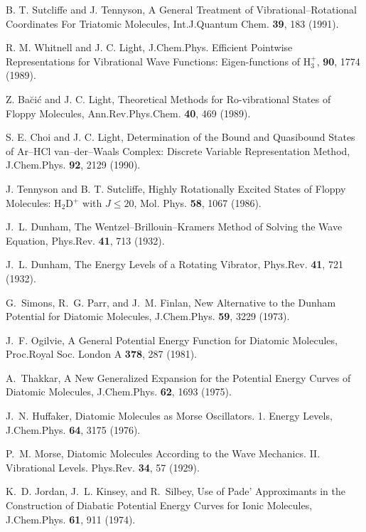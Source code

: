 \begin{thebibliography}{999}
B. T. Sutcliffe and J. Tennyson, 
A General Treatment of Vibrational--Rotational Coordinates
For Triatomic Molecules,
Int.J.Quantum Chem. {\bf 39},
183 (1991).

R. M. Whitnell and J. C. Light, J.Chem.Phys. 
Efficient Pointwise Representations for
Vibrational Wave Functions: Eigen-functions of H$_3^+$,
{\bf 90}, 1774 (1989).

Z. Ba\u{c}i\'{c} and J. C. Light, 
Theoretical Methods for Ro-vibrational States of Floppy 
Molecules,
Ann.Rev.Phys.Chem. {\bf 40}, 
469 (1989).

S. E. Choi and J. C. Light, 
Determination of the Bound and Quasibound States of Ar--HCl
van--der--Waals Complex:
Discrete Variable Representation Method,
J.Chem.Phys. {\bf 92}, 2129 (1990).

J. Tennyson and B. T. Sutcliffe, 
Highly Rotationally Excited
States of Floppy Molecules: H$_2$D$^+$ with $J \leq 20$,
Mol. Phys. {\bf 58}, 1067 (1986).


J.~L. Dunham,
The Wentzel--Brillouin--Kramers Method of Solving
the Wave Equation,
\newblock Phys.Rev. {\bf 41}, 713 (1932).

J.~L. Dunham,
The Energy Levels of a Rotating Vibrator,
\newblock Phys.Rev. {\bf 41}, 721 (1932).

G.~Simons, R.~G. Parr, and J.~M. Finlan,
New Alternative to the Dunham Potential for Diatomic Molecules,
\newblock J.Chem.Phys. {\bf 59}, 3229 (1973).

J.~F. Ogilvie,
A General Potential Energy Function for Diatomic Molecules,
\newblock Proc.Royal Soc. London A {\bf 378}, 287 (1981).

A.~Thakkar,
A New Generalized Expansion for the Potential Energy 
Curves of Diatomic Molecules,
\newblock J.Chem.Phys. {\bf 62}, 1693 (1975).

J.~N. Huffaker,
Diatomic Molecules as Morse Oscillators. 1. Energy Levels,
\newblock J.Chem.Phys. {\bf 64}, 3175 (1976).

P.~M. Morse,
Diatomic Molecules According to the Wave Mechanics. II. 
Vibrational Levels.
\newblock Phys.Rev. {\bf 34}, 57 (1929).

K.~D. Jordan, J.~L. Kinsey, and R.~Silbey,
Use of Pade' Approximants in the Construction of 
Diabatic Potential Energy Curves for Ionic Molecules,
\newblock J.Chem.Phys. {\bf 61}, 911 (1974).


\end{thebibliography}
